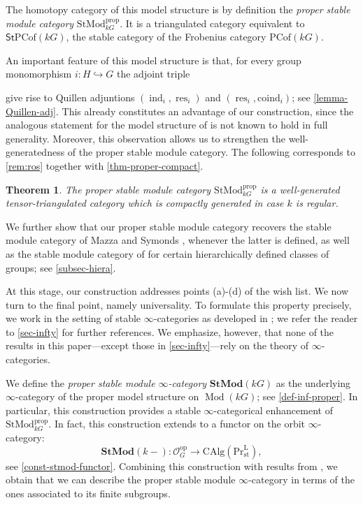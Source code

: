 \documentclass{amsart}
\newcommand{\res}{\operatorname{res}\nolimits}
\newcommand{\ind}{\operatorname{ind}\nolimits}
\DeclareMathOperator{\Mod}{Mod}
\numberwithin{equation}{section}%
\newtheorem{thmx}{Theorem}
\theoremstyle{remark}
\begin{document}
The homotopy category of this model structure is by definition the \textit{proper stable module category} $\mathrm{StMod}^{\mathrm{prop}}_{kG}$. It is a triangulated category equivalent to $\mathsf{St}\mathrm{PCof}(kG)$, the stable category of the Frobenius category $\mathrm{PCof}(kG)$.

An important feature of this model structure is that, for every group monomorphism $i\colon H\hookrightarrow G$ the adjoint triple
\begin{center}
    \end{center}
give rise to Quillen adjuntions $(\ind_i,\res_i)$ and $(\res_i,\mathrm{coind}_i)$; see \cref{lemma-Quillen-adj}. This already constitutes an advantage of our construction, since the analogous statement for the model structure of \cite{ET_cof} is not known to hold in full generality.
Moreover, this observation allows us to strengthen the well-generatedness of the proper stable module category. The following corresponds to \cref{rem:ros} together with \cref{thm-proper-compact}. 

\begin{thmx}
    The proper stable module category $\mathrm{StMod}^{\mathrm{prop}}_{kG}$ is a well-generated tensor-triangulated category which is compactly generated in case $k$ is regular.
\end{thmx}


We further show that our proper stable module category recovers the stable module category of Mazza and Symonds \cite{MS19}, whenever the latter is defined, as well as the stable module category of \cite{ET_cof} for certain hierarchically defined classes of groups; see \cref{subsec-hiera}.

At this stage, our construction addresses points (a)-(d) of the wish list. We now turn to the final point, namely universality. To formulate this property precisely, we work in the setting of stable $\infty$-categories as developed in \cite{Lur17}; we refer the reader to \cref{sec-infty} for further references.  
We emphasize, however, that none of the results in this paper—except those in \cref{sec-infty}—rely on the theory of $\infty$-categories.


We define the \textit{proper stable module $\infty$-category} $\mathbf{StMod}(kG)$ as the underlying $\infty$-category of the proper model structure on $\Mod(kG)$; see \cref{def-inf-proper}. In particular, this construction provides a stable $\infty$-categorical enhancement of $\mathrm{StMod}^{\mathrm{prop}}_{kG}$.
In fact, this construction extends to a functor on the orbit $\infty$-category:
\[
\mathbf{StMod}(k-)\colon \mathcal{O}_G^\mathrm{op} \to \mathrm{CAlg}(\mathrm{Pr}^\mathrm{L}_\mathrm{st}),
\]
see \cref{const-stmod-functor}. Combining this construction with results from \cite{GP26}, we obtain that we can describe the proper stable module $\infty$-category in terms of the ones associated to its finite subgroups. 
\end{document}
